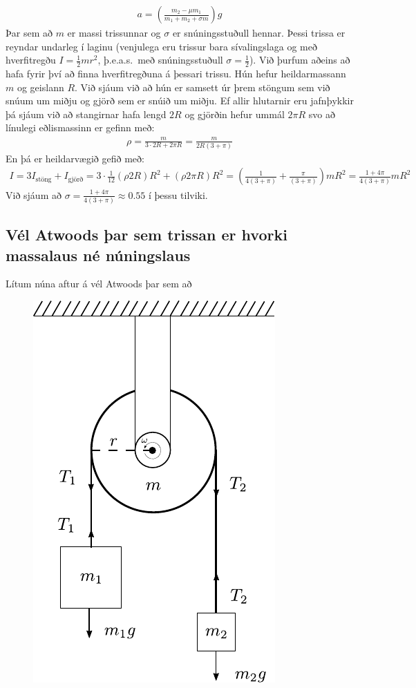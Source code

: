 \ifdefined \wholebook \else\documentclass[oneside]{book}\usepackage{EdlBook}\graphicspath{{figures/}}
\begin{document}
\begin{align*}
    a = \left(\frac{m_2 - \mu m_1}{m_1 + m_2 + \sigma m}\right) g
\end{align*}
Þar sem að $m$ er massi trissunnar og $\sigma$ er snúningsstuðull hennar. Þessi trissa er reyndar undarleg í laginu (venjulega eru trissur bara sívalingslaga og með hverfitregðu $I = \frac{1}{2}mr^2$, þ.e.a.s.~með snúningsstuðull $\sigma = \frac{1}{2}$). Við þurfum aðeins að hafa fyrir því að finna hverfitregðuna 
á þessari trissu. Hún hefur heildarmassann $m$ og geislann $R$. Við sjáum við að hún er samsett úr þrem stöngum sem við snúum um miðju og gjörð sem er snúið um miðju. Ef allir hlutarnir eru jafnþykkir þá sjáum við að stangirnar hafa lengd $2R$ og gjörðin hefur ummál $2\pi R$ svo að línulegi eðlismassinn er gefinn með:
\begin{align*}
    \rho = \frac{m}{3\cdot 2R + 2\pi R} = \frac{m}{2R(3 + \pi)}
\end{align*}
En þá er heildarvægið gefið með:
\begin{align*}
    I =3 I_{\text{stöng}} + I_{\text{gjörð}} = 3 \cdot \frac{1}{12}(\rho 2R) R^2 + (\rho 2\pi R)R^2 = \left( \frac{1}{4(3+\pi)} + \frac{\pi}{(3+\pi)}  \right)mR^2 = \frac{1+4\pi}{4(3+\pi)} mR^2
\end{align*}
Við sjáum að $\sigma = \frac{1+4\pi}{4(3+\pi)} \approx 0.55$ í þessu tilviki.


\subsection*{Vél Atwoods þar sem trissan er hvorki massalaus né núningslaus}

Lítum núna aftur á vél Atwoods þar sem að 

\begin{figure}[H]
    \centering
    \includegraphics[scale=0.8]{figures/atwoodrot4.pdf}
\end{figure}
\end{document}
